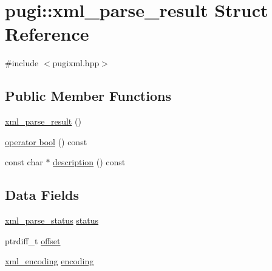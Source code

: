 \hypertarget{structpugi_1_1xml__parse__result}{\section{pugi\-:\-:xml\-\_\-parse\-\_\-result Struct Reference}
\label{structpugi_1_1xml__parse__result}
}


{\ttfamily \#include $<$pugixml.\-hpp$>$}

\subsection*{Public Member Functions}
\begin{DoxyCompactItemize}
\item 
\hyperlink{structpugi_1_1xml__parse__result_a089c4cc4253638c7faa8f0726f0d0272}{xml\-\_\-parse\-\_\-result} ()
\item 
\hyperlink{structpugi_1_1xml__parse__result_a1fd8f66dd233df5f76f63dea8627e589}{operator bool} () const 
\item 
const char $\ast$ \hyperlink{structpugi_1_1xml__parse__result_add183854c1798f4c8ae74f40def79b03}{description} () const 
\end{DoxyCompactItemize}
\subsection*{Data Fields}
\begin{DoxyCompactItemize}
\item 
\hyperlink{namespacepugi_a9054ca609e12afb8f3e5892fc6c0b555}{xml\-\_\-parse\-\_\-status} \hyperlink{structpugi_1_1xml__parse__result_af8b3e6badea671931017695c8a9dd1af}{status}
\item 
ptrdiff\-\_\-t \hyperlink{structpugi_1_1xml__parse__result_adb61df40459ba6fb1083d22467983086}{offset}
\item 
\hyperlink{namespacepugi_a03f708f86abeff5fce6842ffd6a0951e}{xml\-\_\-encoding} \hyperlink{structpugi_1_1xml__parse__result_ad11f279dfce644dfe297e24dc5f72c01}{encoding}
\end{DoxyCompactItemize}


